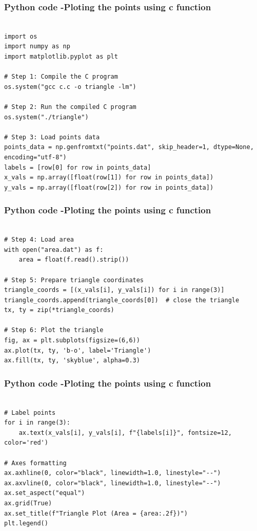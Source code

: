 \documentclass{beamer}
\begin{document}
	
\begin{frame}[fragile]                              
	\frametitle{Python code -Ploting the points using c function}
		\begin{lstlisting}

import os
import numpy as np
import matplotlib.pyplot as plt

# Step 1: Compile the C program
os.system("gcc c.c -o triangle -lm")

# Step 2: Run the compiled C program
os.system("./triangle")

# Step 3: Load points data
points_data = np.genfromtxt("points.dat", skip_header=1, dtype=None, encoding="utf-8")
labels = [row[0] for row in points_data]
x_vals = np.array([float(row[1]) for row in points_data])
y_vals = np.array([float(row[2]) for row in points_data])
\end{lstlisting}
\end{frame}

	
\begin{frame}[fragile]                              
	\frametitle{Python code -Ploting the points using c function}
		\begin{lstlisting}

# Step 4: Load area
with open("area.dat") as f:
    area = float(f.read().strip())

# Step 5: Prepare triangle coordinates
triangle_coords = [(x_vals[i], y_vals[i]) for i in range(3)]
triangle_coords.append(triangle_coords[0])  # close the triangle
tx, ty = zip(*triangle_coords)

# Step 6: Plot the triangle
fig, ax = plt.subplots(figsize=(6,6))
ax.plot(tx, ty, 'b-o', label='Triangle')
ax.fill(tx, ty, 'skyblue', alpha=0.3)
\end{lstlisting}
\end{frame}

	
\begin{frame}[fragile]                              
	\frametitle{Python code -Ploting the points using c function}
		\begin{lstlisting}

# Label points
for i in range(3):
    ax.text(x_vals[i], y_vals[i], f"{labels[i]}", fontsize=12, color='red')

# Axes formatting
ax.axhline(0, color="black", linewidth=1.0, linestyle="--")
ax.axvline(0, color="black", linewidth=1.0, linestyle="--")
ax.set_aspect("equal")
ax.grid(True)
ax.set_title(f"Triangle Plot (Area = {area:.2f})")
plt.legend()
\end{lstlisting}
\end{frame}
\end{document}
